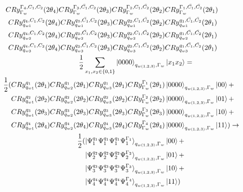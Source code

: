 \documentclass{article}
\begin{document}
\begin{equation}
    \begin{split}
        CRy_{\Gamma_w}^{\Gamma_4,C_1,C_2}(2\theta_4)CRy_{\Gamma_w}^{\Gamma_3,\bar{C_1},C_2}(2\theta_3)CRy_{\Gamma_w}^{\Gamma_2,C_1,\bar{C_2}}(2\theta_2)&CRy_{\Gamma_w}^{\Gamma_1,\bar{C_1},\bar{C_2}}(2\theta_1)\\
        CRy_{q_{w1}}^{q_4,C_1,C_2}(2\theta_4)CRy_{q_{w1}}^{q_3,\bar{C_1},C_2}(2\theta_3)CRy_{q_{w1}}^{q_2,C_1,\bar{C_2}}(2\theta_2)&CRy_{q_{w1}}^{q_1,\bar{C_1},\bar{C_2}}(2\theta_1)\\
        CRy_{q_{w2}}^{q_4,C_1,C_2}(2\theta_4)CRy_{q_{w2}}^{q_3,\bar{C_1},C_2}(2\theta_3)CRy_{q_{w2}}^{q_2,C_1,\bar{C_2}}(2\theta_2)&CRy_{q_{w2}}^{q_1,\bar{C_1},\bar{C_2}}(2\theta_1)\\
        CRy_{q_{w3}}^{q_4,C_1,C_2}(2\theta_4)CRy_{q_{w3}}^{q_3,\bar{C_1},C_2}(2\theta_3)CRy_{q_{w3}}^{q_2,C_1,\bar{C_2}}(2\theta_2)&CRy_{q_{w3}}^{q_1,\bar{C_1},\bar{C_2}}(2\theta_1)\\
        \frac{1}{2}\sum_{x_1,x_2\in\{0,1\}}\ket{0000}_{q_{w(1,2,3)},\Gamma_w}&\ket{ x_1x_2}=\\
        \frac{1}{2}(
        CRy_{q_{w1}}^{q_1}(2\theta_1)CRy_{q_{w2}}^{q_1}(2\theta_1)CRy_{q_{w3}}^{q_1}(2\theta_1) CRy_{\Gamma_w}^{\Gamma_1}(2\theta_1)&\ket{0000}_{q_{w(1,2,3)},\Gamma_w}\ket{ 00}+\\
        CRy_{q_{w1}}^{q_2}(2\theta_2)CRy_{q_{w2}}^{q_2}(2\theta_2)CRy_{q_{w3}}^{q_2}(2\theta_2) CRy_{\Gamma_w}^{\Gamma_2}(2\theta_2)&\ket{0000}_{q_{w(1,2,3)},\Gamma_w}\ket{ 01}+\\
        CRy_{q_{w1}}^{q_3}(2\theta_3)CRy_{q_{w2}}^{q_3}(2\theta_3)CRy_{q_{w3}}^{q_3}(2\theta_3) CRy_{\Gamma_w}^{\Gamma_3}(2\theta_3)&\ket{0000}_{q_{w(1,2,3)},\Gamma_w}\ket{ 10}+\\
        CRy_{q_{w1}}^{q_4}(2\theta_4)CRy_{q_{w2}}^{q_4}(2\theta_4)CRy_{q_{w3}}^{q_4}(2\theta_4) CRy_{\Gamma_w}^{\Gamma_4}(2\theta_4)&\ket{0000}_{q_{w(1,2,3)},\Gamma_w}\ket{ 11})\to\\
        \frac{1}{2}(
        \ket{\Psi^{q_1}_1\Psi^{q_1}_1\Psi^{q_1}_1\Psi^{\Gamma_1}_1}_{q_{w(1,2,3)},\Gamma_w}&\ket{ 00}+\\
        \ket{\Psi^{q_2}_2\Psi^{q_2}_2\Psi^{q_2}_2\Psi^{\Gamma_2}_2}_{q_{w(1,2,3)},\Gamma_w}&\ket{ 01}+\\
        \ket{\Psi^{q_3}_3\Psi^{q_3}_3\Psi^{q_3}_3\Psi^{\Gamma_3}_3}_{q_{w(1,2,3)},\Gamma_w}&\ket{ 10}+\\
        \ket{\Psi^{q_4}_4\Psi^{q_4}_4\Psi^{q_4}_4\Psi^{\Gamma_4}_4}_{q_{w(1,2,3)},\Gamma_w}&\ket{ 11}
        )
    \end{split}
\end{equation}
\end{document}
